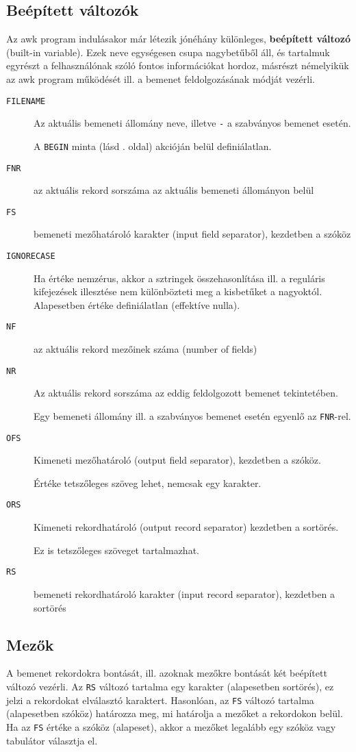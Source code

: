 \subsection{Beépített változók}
Az awk program indulásakor már létezik jónéhány különleges, \textbf{beépített változó} (built-in variable). 
Ezek neve egységesen csupa nagybetűből áll, és tartalmuk egyrészt a felhasználónak szóló fontos információkat hordoz,
másrészt némelyikük az awk program működését ill. a bemenet feldolgozásának módját vezérli.
\begin{description}
\item[\tt FILENAME] Az aktuális bemeneti állomány neve, illetve \texttt{-} a szabványos bemenet esetén. 

	A \texttt{BEGIN} minta (lásd \pageref{begin}. oldal) akcióján belül definiálatlan.
\item[\tt FNR] az aktuális rekord sorszáma az aktuális bemeneti állományon belül
\item[\tt FS] bemeneti mezőhatároló karakter (input field separator), kezdetben a szóköz
\item[\tt IGNORECASE] Ha értéke nemzérus, akkor a sztringek összehasonlítása ill. a
reguláris kifejezések illesztése nem különbözteti meg a kisbetűket a nagyoktól. Alapesetben értéke definiálatlan (effektíve nulla).
\item[\tt NF] az aktuális rekord mezőinek száma (number of fields)
\item[\tt NR] Az aktuális rekord sorszáma az eddig feldolgozott bemenet tekintetében. 

	Egy bemeneti állomány ill. a szabványos bemenet esetén egyenlő az \texttt{FNR}-rel.
\item[\tt OFS] Kimeneti mezőhatároló (output field separator), kezdetben a szóköz. 

	Értéke tetszőleges szöveg lehet, nemcsak egy karakter.
\item[\tt ORS] Kimeneti rekordhatároló (output record separator) kezdetben a sortörés. 

	Ez is tetszőleges szöveget tartalmazhat.
\item[\tt RS] bemeneti rekordhatároló karakter (input record separator), kezdetben a sortörés
\end{description}



\subsection{Mezők}
A bemenet rekordokra bontását, ill. azoknak mezőkre bontását két beépített változó vezérli. 
Az \texttt{RS} változó tartalma egy karakter (alapesetben sortörés), ez jelzi a rekordokat elválasztó karaktert. 
Hasonlóan, az \texttt{FS} változó tartalma (alapesetben szóköz) határozza meg, mi határolja a mezőket a rekordokon
belül. Ha az \texttt{FS} értéke a szóköz (alapeset), akkor a mezőket legalább egy szóköz vagy tabulátor választja el.

